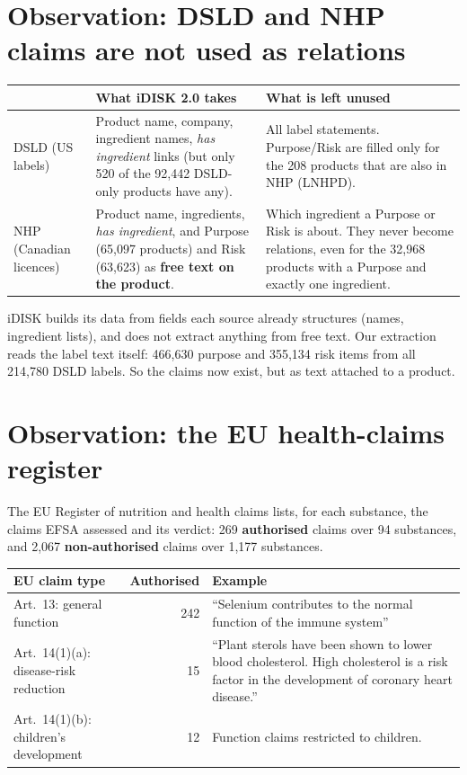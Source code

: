 \documentclass[10pt,a4paper]{article}
\newcommand{\rel}[1]{\emph{#1}}
\begin{document}
\section{Observation: DSLD and NHP claims are not used as relations}

\begin{table}[H]
\small
\begin{tabularx}{\linewidth}{@{}l L L@{}}
\toprule
& \textbf{What iDISK 2.0 takes} & \textbf{What is left unused} \\
\midrule
DSLD (US labels) &
  Product name, company, ingredient names, \rel{has ingredient} links (but only 520 of the 92,442
  DSLD-only products have any). &
  All label statements. Purpose/Risk are filled only for the 208 products that are also in NHP
  (LNHPD). \\
NHP (Canadian licences) &
  Product name, ingredients, \rel{has ingredient}, and Purpose (65,097 products) and Risk (63,623)
  as \textbf{free text on the product}. &
  Which ingredient a Purpose or Risk is about. They never become relations, even for the 32,968
  products with a Purpose and exactly one ingredient. \\
\bottomrule
\end{tabularx}
\end{table}

iDISK builds its data from fields each source already structures (names, ingredient lists), and does
not extract anything from free text. Our extraction reads the label text itself: 466,630 purpose and
355,134 risk items from all 214,780 DSLD labels. So the claims now exist, but as text attached to a
product.

\section{Observation: the EU health-claims register}

The EU Register of nutrition and health claims lists, for each substance, the claims EFSA assessed and
its verdict: 269 \textbf{authorised} claims over 94 substances, and 2,067 \textbf{non-authorised}
claims over 1,177 substances.

\begin{table}[H]
\small
\begin{tabularx}{\linewidth}{@{}l r L@{}}
\toprule
EU claim type & Authorised & Example \\
\midrule
Art.\ 13: general function & 242 & ``Selenium contributes to the normal function of the immune system'' \\
Art.\ 14(1)(a): disease-risk reduction & 15 & ``Plant sterols have been shown to lower blood
  cholesterol. High cholesterol is a risk factor in the development of coronary heart disease.'' \\
Art.\ 14(1)(b): children's development & 12 & Function claims restricted to children. \\
\bottomrule
\end{tabularx}
\end{table}
\end{document}
